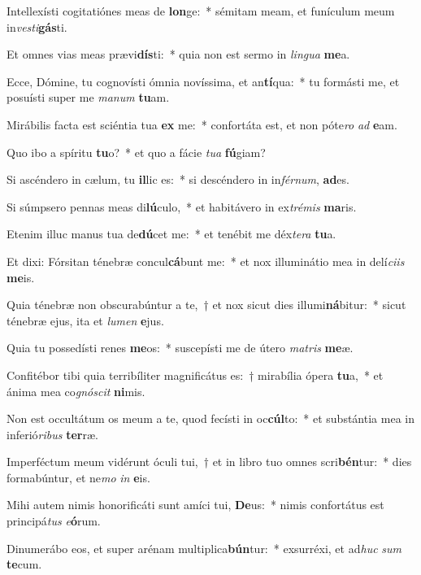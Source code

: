 \item Intellexísti cogitatiónes meas de \textbf{lon}ge:~* sémitam meam, et funículum meum in\textit{ves}\textit{ti}\textbf{gás}ti.
\item Et omnes vias meas prævi\textbf{dís}ti:~* quia non est sermo in \textit{lin}\textit{gua} \textbf{me}a.
\item Ecce, Dómine, tu cognovísti ómnia novíssima, et an\textbf{tí}qua:~* tu formásti me, et posuísti super me \textit{ma}\textit{num} \textbf{tu}am.
\item Mirábilis facta est sciéntia tua \textbf{ex} me:~* confortáta est, et non póte\textit{ro} \textit{ad} \textbf{e}am.
\item Quo ibo a spíritu \textbf{tu}o?~* et quo a fácie \textit{tu}\textit{a} \textbf{fú}giam?
\item Si ascéndero in cælum, tu \textbf{il}lic es:~* si descéndero in in\textit{fér}\textit{num}, \textbf{ad}es.
\item Si súmpsero pennas meas di\textbf{lú}culo,~* et habitávero in ex\textit{tré}\textit{mis} \textbf{ma}ris.
\item Etenim illuc manus tua de\textbf{dú}cet me:~* et tenébit me déx\textit{te}\textit{ra} \textbf{tu}a.
\item Et dixi: Fórsitan ténebræ concul\textbf{cá}bunt me:~* et nox illuminátio mea in delí\textit{ci}\textit{is} \textbf{me}is.
\item Quia ténebræ non obscurabúntur a te,~† et nox sicut dies illumi\textbf{ná}bitur:~* sicut ténebræ ejus, ita et \textit{lu}\textit{men} \textbf{e}jus.
\item Quia tu possedísti renes \textbf{me}os:~* suscepísti me de útero \textit{ma}\textit{tris} \textbf{me}æ.
\item Confitébor tibi quia terribíliter magnificátus es:~† mirabília ópera \textbf{tu}a,~* et ánima mea co\textit{gnó}\textit{scit} \textbf{ni}mis.
\item Non est occultátum os meum a te, quod fecísti in oc\textbf{cúl}to:~* et substántia mea in inferió\textit{ri}\textit{bus} \textbf{ter}ræ.
\item Imperféctum meum vidérunt óculi tui,~† et in libro tuo omnes scri\textbf{bén}tur:~* dies formabúntur, et ne\textit{mo} \textit{in} \textbf{e}is.
\item Mihi autem nimis honorificáti sunt amíci tui, \textbf{De}us:~* nimis confortátus est principá\textit{tus} \textit{e}\textbf{ó}rum.
\item Dinumerábo eos, et super arénam multiplica\textbf{bún}tur:~* exsurréxi, et ad\textit{huc} \textit{sum} \textbf{te}cum.
